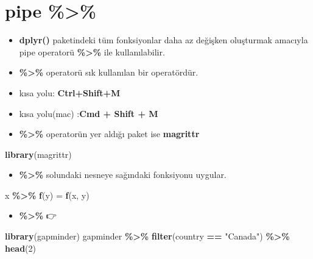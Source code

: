 \documentclass[
  oneside]{book}
\newenvironment{Shaded}{\begin{snugshade}}{\end{snugshade}}
\newcommand{\DecValTok}[1]{\textcolor[rgb]{0.00,0.00,0.81}{#1}}
\newcommand{\FunctionTok}[1]{\textcolor[rgb]{0.13,0.29,0.53}{\textbf{#1}}}
\newcommand{\NormalTok}[1]{#1}
\newcommand{\OtherTok}[1]{\textcolor[rgb]{0.56,0.35,0.01}{#1}}
\newcommand{\SpecialCharTok}[1]{\textcolor[rgb]{0.81,0.36,0.00}{\textbf{#1}}}
\newcommand{\StringTok}[1]{\textcolor[rgb]{0.31,0.60,0.02}{#1}}
\providecommand{\tightlist}{%
  \setlength{\itemsep}{0pt}\setlength{\parskip}{0pt}}
\begin{document}
\hypertarget{pipe}{%
\section{\texorpdfstring{pipe \textbf{\%\textgreater\%}}{pipe \%\textgreater\%}}\label{pipe}}

\begin{itemize}
\item
  \textbf{dplyr()} paketindeki tüm fonksiyonlar daha az değişken oluşturmak amacıyla pipe operatorü \textbf{\%\textgreater\%} ile kullanılabilir.
\item
  \textbf{\%\textgreater\%} operatorü sık kullanılan bir operatördür.
\item
  kısa yolu: \textbf{Ctrl+Shift+M}
\item
  kısa yolu(mac) :\textbf{Cmd + Shift + M}
\item
  \textbf{\%\textgreater\%} operatorün yer aldığı paket ise \textbf{magrittr}
\end{itemize}

\begin{Shaded}
\begin{Highlighting}[]
\FunctionTok{library}\NormalTok{(magrittr)}
\end{Highlighting}
\end{Shaded}

\begin{itemize}
\tightlist
\item
  \textbf{\%\textgreater\%} solundaki nesneye sağındaki fonksiyonu uygular.
\end{itemize}

\begin{Shaded}
\begin{Highlighting}[]
\NormalTok{x }\SpecialCharTok{\%\textgreater{}\%} \FunctionTok{f}\NormalTok{(y) }\OtherTok{=} \FunctionTok{f}\NormalTok{(x, y)}
\end{Highlighting}
\end{Shaded}

\begin{itemize}
\tightlist
\item
  \textbf{\%\textgreater\%} 👉
\end{itemize}

\begin{Shaded}
\begin{Highlighting}[]
\FunctionTok{library}\NormalTok{(gapminder)}
\NormalTok{gapminder }\SpecialCharTok{\%\textgreater{}\%}
  \FunctionTok{filter}\NormalTok{(country }\SpecialCharTok{==} \StringTok{"Canada"}\NormalTok{) }\SpecialCharTok{\%\textgreater{}\%}
  \FunctionTok{head}\NormalTok{(}\DecValTok{2}\NormalTok{)}
\end{Highlighting}
\end{Shaded}
\end{document}
